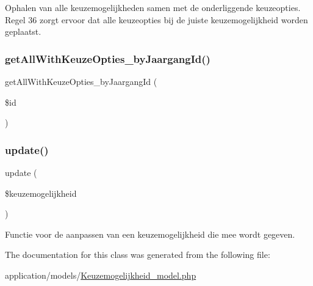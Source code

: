 Ophalen van alle keuzemogelijkheden samen met de onderliggende keuzeopties. Regel 36 zorgt ervoor dat alle keuzeopties bij de juiste keuzemogelijkheid worden geplaatst. 

\mbox{\label{class_keuzemogelijkheid___model_afee956c75c2fe9966783b18602ace19a}} 
\subsubsection{\texorpdfstring{get\+All\+With\+Keuze\+Opties\+\_\+by\+Jaargang\+Id()}{getAllWithKeuzeOpties\_byJaargangId()}}
{\footnotesize\ttfamily get\+All\+With\+Keuze\+Opties\+\_\+by\+Jaargang\+Id (\begin{DoxyParamCaption}\item[{}]{\$id }\end{DoxyParamCaption})}

\mbox{\label{class_keuzemogelijkheid___model_a933a162ba87e58d4cc7eb781fd571a7a}} 
\subsubsection{\texorpdfstring{update()}{update()}}
{\footnotesize\ttfamily update (\begin{DoxyParamCaption}\item[{}]{\$keuzemogelijkheid }\end{DoxyParamCaption})}



Functie voor de aanpassen van een keuzemogelijkheid die mee wordt gegeven. 



The documentation for this class was generated from the following file\+:\begin{DoxyCompactItemize}
\item 
application/models/\mbox{\hyperlink{_keuzemogelijkheid__model_8php}{Keuzemogelijkheid\+\_\+model.\+php}}\end{DoxyCompactItemize}
